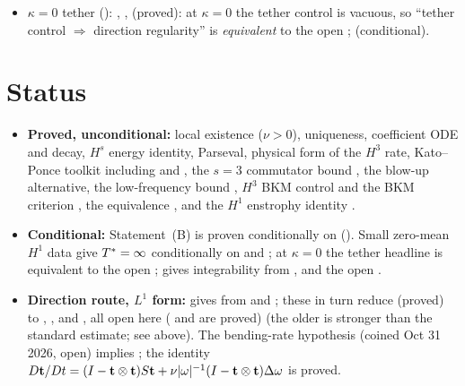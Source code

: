 \documentclass[11pt]{article}
\begin{document}
\begin{itemize}
\item $\kappa=0$ tether (): , ,  (proved): at $\kappa=0$ the tether control is vacuous, so ``tether control $\Rightarrow$ direction regularity'' is \emph{equivalent} to the open ;  (conditional).
\end{itemize}

\section{Status}\label{sec:status}
\begin{itemize}
\item \textbf{Proved, unconditional:} local existence ($\nu>0$), uniqueness, coefficient ODE and decay, $H^s$ energy identity, Parseval, physical form of the $H^3$ rate, Kato--Ponce toolkit including  and , the $s=3$ commutator bound , the blow-up alternative, the low-frequency bound , $H^3$ BKM control  and the BKM criterion , the equivalence , and the $H^1$ enstrophy identity .
\item \textbf{Conditional:} Statement~(B) is proven conditionally on  (). Small zero-mean $H^1$ data give $T^{*}=\infty$ conditionally on  and ; at $\kappa=0$ the tether headline is equivalent to the open ;  gives integrability from ,  and the open .
\item \textbf{Direction route, $L^1$ form:}  gives  from  and ; these in turn reduce (proved) to , ,  and , all open here ( and  are proved) (the older  is stronger than the standard estimate; see above). The bending-rate hypothesis  (coined Oct 31 2026, open) implies ; the identity $D\mathbf t/Dt=(I-\mathbf t\otimes\mathbf t)S\mathbf t+\nu\lvert\omega\rvert^{-1}(I-\mathbf t\otimes\mathbf t)\Delta\omega$ is proved.

\end{itemize}
\end{document}
